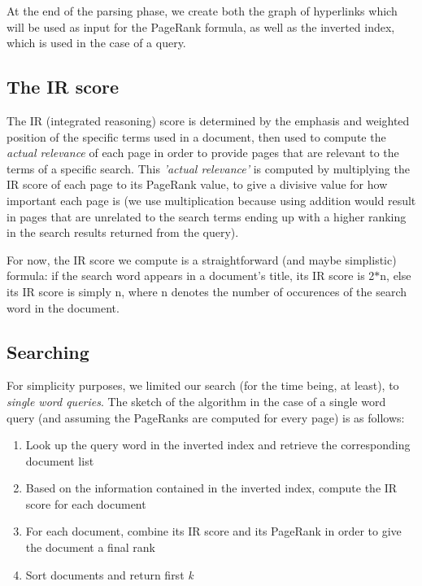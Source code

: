 \documentclass[pdftex,12pt,a4paper]{article}
\begin{document}
At the end of the parsing phase, we create both the graph of hyperlinks which will be used as input for the PageRank formula, as well as the inverted index, which is used in the case of a query.

\subsection{The IR score}

The IR (integrated reasoning) score is determined by the emphasis and weighted position of the specific terms used in a document, then used to compute the \emph{actual relevance} of each page in order to provide pages that are relevant to the terms of a specific search. This \emph{'actual relevance'} is computed by multiplying the IR score of each page to its PageRank value, to give a divisive value for how important each page is (we use multiplication because using addition would result in pages that are unrelated to the search terms ending up with a higher ranking in the search results returned from the query).

For now, the IR score we compute is a straightforward (and maybe simplistic) formula: if the search word appears in a document's title, its IR score is 2$*$n, else its IR score is simply n, where n denotes the number of occurences of the search word in the document.

\subsection{Searching}

For simplicity purposes, we limited our search (for the time being, at least), to \emph{single word queries}. The sketch of the algorithm in the case of a single word query (and assuming the PageRanks are computed for every page) is as follows:
\begin{enumerate}
\item  Look up the query word in the inverted index and retrieve the corresponding document list
\item Based on the information contained in the inverted index, compute the IR score for each document 
\item For each document, combine its IR score and its PageRank in order to give the document a final rank
\item Sort documents and return first \emph{k} 
\end{enumerate}
\end{document}
